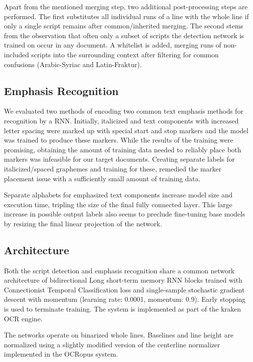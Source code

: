 Apart from the mentioned merging step, two additional post-processing steps are
performed. The first substitutes all individual runs of a line with the whole
line if only a single script remains after common/inherited merging. The second
stems from the observation that often only a subset of scripts the detection
network is trained on occur in any document. A whitelist is added, merging
runs of non-included scripts into the surrounding context after filtering for
common confusions (Arabic-Syriac and Latin-Fraktur).

\subsection{Emphasis Recognition}
\label{sec:emph}

We evaluated two methods of encoding two common text emphasis methods for
recognition by a RNN. Initially, italicized and text components with increased
letter spacing were marked up with special start and stop markers and the model
was trained to produce these markers. While the results of the training were
promising, obtaining the amount of training data needed to reliably place both
markers was infeasible for our target documents. Creating separate labels for
italicized/spaced graphemes and training for these, remedied the marker
placement issue with a sufficiently small amount of training data.

Separate alphabets for emphasized text components increase model size and
execution time, tripling the size of the final fully connected layer. This
large increase in possible output labels also seems to preclude fine-tuning
base models by resizing the final linear projection of the network.

\subsection{Architecture}

Both the script detection and emphasis recognition share a common network
architecture of bidirectional Long short-term memory RNN blocks trained with
Connectionist Temporal Classification loss and single-sample stochastic
gradient descent with momentum (learning rate: 0.0001, momentum: 0.9). Early
stopping is used to terminate training. The system is implemented as part of
the kraken OCR engine.

The networks operate on binarized whole lines. Baselines and line height are
normalized using a slightly modified version of the centerline normalizer
implemented in the OCRopus system.

